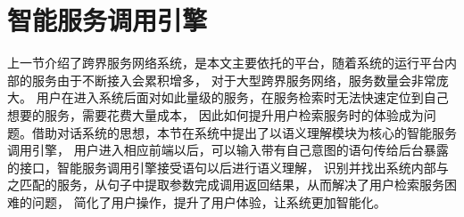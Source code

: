  

    

    
    
    


  
  
  
\section{智能服务调用引擎}

上一节介绍了跨界服务网络系统，是本文主要依托的平台，随着系统的运行平台内部的服务由于不断接入会累积增多，
对于大型跨界服务网络，服务数量会非常庞大。
用户在进入系统后面对如此量级的服务，在服务检索时无法快速定位到自己想要的服务，需要花费大量成本，
因此如何提升用户检索服务时的体验成为问题。借助对话系统的思想，本节在系统中提出了以语义理解模块为核心的智能服务调用引擎，
用户进入相应前端以后，可以输入带有自己意图的语句传给后台暴露的接口，智能服务调用引擎接受语句以后进行语义理解，
识别并找出系统内部与之匹配的服务，从句子中提取参数完成调用返回结果，从而解决了用户检索服务困难的问题，
简化了用户操作，提升了用户体验，让系统更加智能化。

